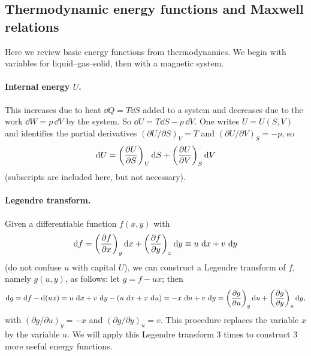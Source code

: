 \subsection{Thermodynamic energy functions and Maxwell relations}

Here we review basic energy functions from thermodynamics. We begin with variables for
liquid--gas--solid, then with a magnetic system.

\paragraph{Internal energy $U$.} This increases due to heat $\dd Q = T\dd S$ added to a
system and decreases due to the work $\dd W = p\,\dd V$ by the system. So
$\dd U = T\dd S - p\,\dd V$. One writes $U = U(S,V)$ and identifies the partial derivatives
$(\partial U/\partial S)_V = T$ and $(\partial U/\partial V)_S = -p$, so
\begin{equation}
  \mathop{}\!\mathrm{d} U = \left(\frac{\partial U}{\partial S}\right)_V\mathop{}\!\mathrm{d} S + \left(\frac{\partial U}{\partial V}\right)_S\mathop{}\!\mathrm{d} V
\end{equation}
(subscripts are included here, but not necessary).

\paragraph{Legendre transform.} Given a differentiable function $f(x,y)$ with
\begin{equation}
  \mathop{}\!\mathrm{d} f = \left(\frac{\partial f}{\partial x}\right)_y\mathop{}\!\mathrm{d} x + \left(\frac{\partial f}{\partial y}\right)_x\mathop{}\!\mathrm{d} y \equiv u\,\mathop{}\!\mathrm{d} x + v\,\mathop{}\!\mathrm{d} y
\end{equation}
(do not confuse $u$ with capital $U$), we can construct a Legendre transform of $f$,
namely $g(u,y)$, as follows: let $g = f - ux$; then
\begin{equation}
  \dd g = \dd f - \dd(ux) = u\,\dd x + v\,\dd y - (u\,\dd x + x\,\dd u)
        = -x\,\dd u + v\,\dd y
        = \left(\pder{g}{u}\right)_y\dd u + \left(\pder{g}{y}\right)_u\dd y,
\end{equation}
with $(\partial g/\partial u)_y = -x$ and $(\partial g/\partial y)_u = v$. This procedure
replaces the variable $x$ by the variable $u$. We will apply this Legendre transform 3
times to construct 3 more useful energy functions.

